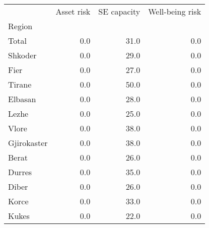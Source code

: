 \begin{tabular}{lrrr}
\toprule
{} &  Asset risk &  SE capacity &  Well-being risk \\
Region      &             &              &                  \\
\midrule
Total       &         0.0 &         31.0 &              0.0 \\
Shkoder     &         0.0 &         29.0 &              0.0 \\
Fier        &         0.0 &         27.0 &              0.0 \\
Tirane      &         0.0 &         50.0 &              0.0 \\
Elbasan     &         0.0 &         28.0 &              0.0 \\
Lezhe       &         0.0 &         25.0 &              0.0 \\
Vlore       &         0.0 &         38.0 &              0.0 \\
Gjirokaster &         0.0 &         38.0 &              0.0 \\
Berat       &         0.0 &         26.0 &              0.0 \\
Durres      &         0.0 &         35.0 &              0.0 \\
Diber       &         0.0 &         26.0 &              0.0 \\
Korce       &         0.0 &         33.0 &              0.0 \\
Kukes       &         0.0 &         22.0 &              0.0 \\
\bottomrule
\end{tabular}
